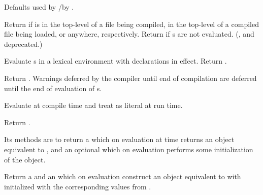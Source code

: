 \begin{LIST}{1cm}
  {
  Defaults used by /by .
  }

  {
  Return  if
   is in the top-level of a file being compiled, in the
  top-level of a compiled file being loaded, or anywhere,
  respectively. Return \retval{\NIL} if s are not
  evaluated. (,  and  deprecated.) 
  }

  {
  Evaluate s in a lexical environment with declarations
   in effect. Return . 
  }

  {
  Return . Warnings deferred by the
  compiler until end of compilation are deferred until the end of
  evaluation of s. 
  }

  {
  Evaluate  at compile time and treat  as
  literal at run time. 
  }

  {
  Return .
  }

  {
  Its methods are to return a  which on
  evaluation at  time returns an object equivalent to
  , and an optional  which on
  evaluation performs some initialization of the object. 
  }

  {
  Return a  and an  which on evaluation construct an object equivalent to
   with  initialized with the corresponding values
  from . 
  }


\end{LIST}
